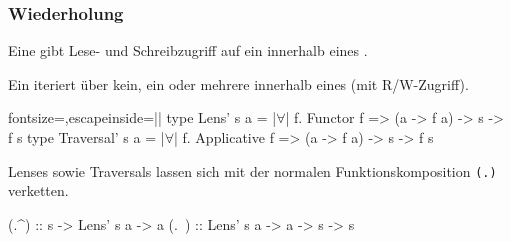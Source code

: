 \documentclass{beamer}
\newcommand{\fa}{$\forall$}
\begin{document}
\begin{frame}[fragile]
  \frametitle{Wiederholung}
  Eine  gibt Lese- und Schreibzugriff auf ein  innerhalb eines .

  Ein  iteriert über kein, ein oder mehrere  innerhalb eines  (mit R/W-Zugriff).

\begin{haskellcode*}{fontsize=\small,escapeinside=||}
type Lens'      s a = |\fa| f.     Functor f => (a -> f a) -> s -> f s
type Traversal' s a = |\fa| f. Applicative f => (a -> f a) -> s -> f s
\end{haskellcode*}

  Lenses sowie Traversals lassen sich mit der normalen Funktionskomposition \verb|(.)| verketten.

\begin{haskellcode}
(.^) :: s -> Lens' s a -> a
(.~) :: Lens' s a -> a -> s -> s
\end{haskellcode}
\end{frame}
\end{document}
